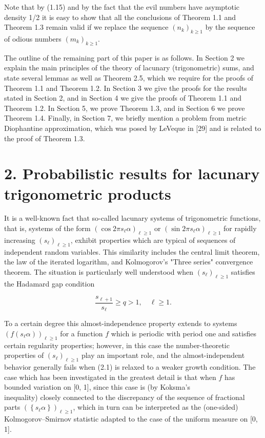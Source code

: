 \documentclass[10pt]{article}
\newcommand{\1}{\mathbf{1}}
\begin{document}
Note that by (1.15) and by the fact that the evil numbers have asymptotic density 1/2 it is easy to show that all the conclusions of Theorem 1.1 and Theorem 1.3 remain valid if we replace the sequence $\left(n_{k}\right)_{k \geqslant 1}$ by the sequence of odious numbers $\left(m_{k}\right)_{k \geqslant 1}$.

The outline of the remaining part of this paper is as follows. In Section 2 we explain the main principles of the theory of lacunary (trigonometric) sums, and state several lemmas as well as Theorem 2.5, which we require for the proofs of Theorem 1.1 and Theorem 1.2. In Section 3 we give the proofs for the results stated in Section 2, and in Section 4 we give the proofs of Theorem 1.1 and Theorem 1.2. In Section 5, we prove Theorem 1.3, and in Section 6 we prove Theorem 1.4. Finally, in Section 7, we briefly mention a problem from metric Diophantine approximation, which was posed by LeVeque in [29] and is related to the proof of Theorem 1.3.

\section*{2. Probabilistic results for lacunary trigonometric products}
It is a well-known fact that so-called lacunary systems of trigonometric functions, that is, systems of the form $\left(\cos 2 \pi s_{\ell} \alpha\right)_{\ell \geqslant 1}$ or $\left(\sin 2 \pi s_{\ell} \alpha\right)_{\ell \geqslant 1}$ for rapidly increasing $\left(s_{\ell}\right)_{\ell \geqslant 1}$, exhibit properties which are typical of sequences of independent random variables. This similarity includes the central limit theorem, the law of the iterated logarithm, and Kolmogorov's "Three series" convergence theorem. The situation is particularly well understood when $\left(s_{\ell}\right)_{\ell \geqslant 1}$ satisfies the Hadamard gap condition


\begin{equation*}
\frac{s_{\ell+1}}{s_{\ell}} \geqslant q>1, \quad \ell \geqslant 1 . \tag{2.1}
\end{equation*}


To a certain degree this almost-independence property extends to systems $\left(f\left(s_{\ell} \alpha\right)\right)_{\ell \geqslant 1}$ for a function $f$ which is periodic with period one and satisfies certain regularity properties; however, in this case the number-theoretic properties of $\left(s_{\ell}\right)_{\ell \geqslant 1}$ play an important role, and the almost-independent behavior generally fails when (2.1) is relaxed to a weaker growth condition. The case which has been investigated in the greatest detail is that when $f$ has bounded variation on [0, 1], since this case is (by Koksma's\\
inequality) closely connected to the discrepancy of the sequence of fractional parts $\left(\left\{s_{\ell} \alpha\right\}\right)_{\ell \geqslant 1}$, which in turn can be interpreted as the (one-sided) Kolmogorov--Smirnov statistic adapted to the case of the uniform measure on [0, 1].
\end{document}
